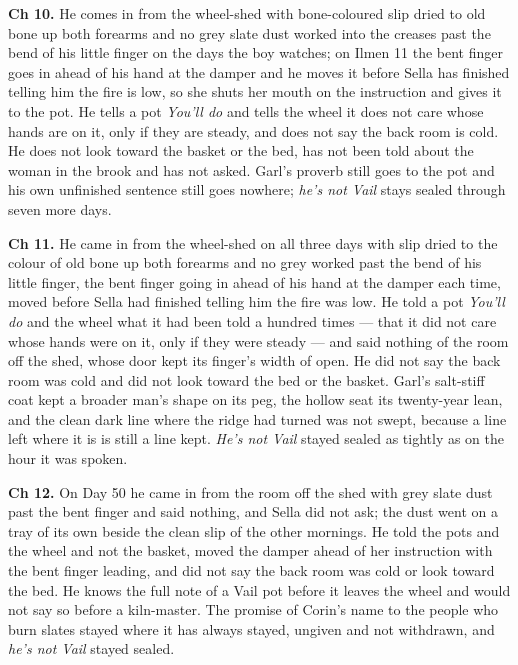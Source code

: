 \documentclass{design/chronicle}
\begin{document}
{\textbf{Ch 10.} He comes in from the wheel-shed with bone-coloured slip dried to old bone up both forearms and no grey slate dust worked into the creases past the bend of his little finger on the days the boy watches; on Ilmen 11 the bent finger goes in ahead of his hand at the damper and he moves it before Sella has finished telling him the fire is low, so she shuts her mouth on the instruction and gives it to the pot. He tells a pot \emph{You’ll do} and tells the wheel it does not care whose hands are on it, only if they are steady, and does not say the back room is cold. He does not look toward the basket or the bed, has not been told about the woman in the brook and has not asked. Garl’s proverb still goes to the pot and his own unfinished sentence still goes nowhere; \emph{he’s not Vail} stays sealed through seven more days.

\textbf{Ch 11.} He came in from the wheel-shed on all three days with slip dried to the colour of old bone up both forearms and no grey worked past the bend of his little finger, the bent finger going in ahead of his hand at the damper each time, moved before Sella had finished telling him the fire was low. He told a pot \emph{You’ll do} and the wheel what it had been told a hundred times --- that it did not care whose hands were on it, only if they were steady --- and said nothing of the room off the shed, whose door kept its finger’s width of open. He did not say the back room was cold and did not look toward the bed or the basket. Garl’s salt-stiff coat kept a broader man’s shape on its peg, the hollow seat its twenty-year lean, and the clean dark line where the ridge had turned was not swept, because a line left where it is is still a line kept. \emph{He’s not Vail} stayed sealed as tightly as on the hour it was spoken.

\textbf{Ch 12.} On Day 50 he came in from the room off the shed with grey slate dust past the bent finger and said nothing, and Sella did not ask; the dust went on a tray of its own beside the clean slip of the other mornings. He told the pots and the wheel and not the basket, moved the damper ahead of her instruction with the bent finger leading, and did not say the back room was cold or look toward the bed. He knows the full note of a Vail pot before it leaves the wheel and would not say so before a kiln-master. The promise of Corin’s name to the people who burn slates stayed where it has always stayed, ungiven and not withdrawn, and \emph{he’s not Vail} stayed sealed.

}
\end{document}
